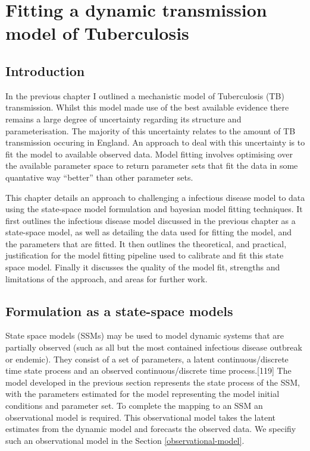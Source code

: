 \documentclass[11pt,twoside]{bristolthesis}
\begin{document}
  \hypertarget{model-fitting}{%
  \chapter{Fitting a dynamic transmission model of Tuberculosis}\label{model-fitting}}
  
  \hypertarget{introduction-7}{%
  \section{Introduction}\label{introduction-7}}
  
  In the previous chapter I outlined a mechanistic model of Tuberculosis (TB) transmission. Whilst this model made use of the best available evidence there remains a large degree of uncertainty regarding its structure and parameterisation. The majority of this uncertainty relates to the amount of TB transmission occuring in England. An approach to deal with this uncertainty is to fit the model to available observed data. Model fitting involves optimising over the available parameter space to return parameter sets that fit the data in some quantative way ``better'' than other parameter sets.
  
  This chapter details an approach to challenging a infectious disease model to data using the state-space model formulation and bayesian model fitting techniques. It first outlines the infectious disease model discussed in the previous chapter as a state-space model, as well as detailing the data used for fitting the model, and the parameters that are fitted. It then outlines the theoretical, and practical, justification for the model fitting pipeline used to calibrate and fit this state space model. Finally it discusses the quality of the model fit, strengths and limitations of the approach, and areas for further work.
  
  \hypertarget{formulation-as-a-state-space-models}{%
  \section{Formulation as a state-space models}\label{formulation-as-a-state-space-models}}
  
  State space models (SSMs) may be used to model dynamic systems that are partially observed (such as all but the most contained infectious disease outbreak or endemic). They consist of a set of parameters, a latent continuous/discrete time state process and an observed continuous/discrete time process.{[}119{]} The model developed in the previous section represents the state process of the SSM, with the parameters estimated for the model representing the model initial conditions and parameter set. To complete the mapping to an SSM an observational model is required. This observational model takes the latent estimates from the dynamic model and forecasts the observed data. We specifiy such an observational model in the Section \ref{observational-model}.
  
\end{document}
